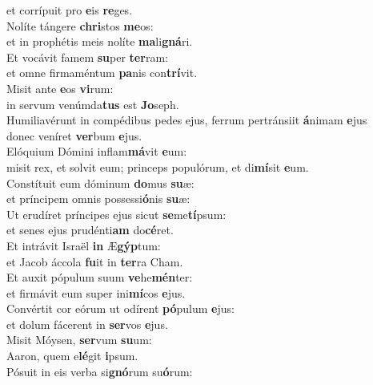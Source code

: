 \evenverse et corrípuit pro \textbf{e}is \textbf{re}ges.\\
\oddverse Nolíte tángere \textbf{chri}stos \textbf{me}os:~\*\\
\oddverse et in prophétis meis nolíte \textbf{ma}li\textbf{gná}ri.\\
\evenverse Et vocávit famem \textbf{su}per \textbf{ter}ram:~\*\\
\evenverse et omne firmaméntum \textbf{pa}nis con\textbf{trí}vit.\\
\oddverse Misit ante \textbf{e}os \textbf{vi}rum:~\*\\
\oddverse in servum venúmda\textbf{tus} est \textbf{Jo}seph.\\
\evenverse Humiliavérunt in compédibus pedes ejus, ferrum pertránsiit \textbf{á}nimam \textbf{e}jus~\*\\
\evenverse donec veníret \textbf{ver}bum \textbf{e}jus.\\
\oddverse Elóquium Dómini inflam\textbf{má}vit \textbf{e}um:~\*\\
\oddverse misit rex, et solvit eum; princeps populórum, et di\textbf{mí}sit \textbf{e}um.\\
\evenverse Constítuit eum dóminum \textbf{do}mus \textbf{su}æ:~\*\\
\evenverse et príncipem omnis possessi\textbf{ó}nis \textbf{su}æ:\\
\oddverse Ut erudíret príncipes ejus sicut \textbf{se}me\textbf{tí}psum:~\*\\
\oddverse et senes ejus prudénti\textbf{am} do\textbf{cé}ret.\\
\evenverse Et intrávit Israël \textbf{in} Æ\textbf{gýp}tum:~\*\\
\evenverse et Jacob áccola \textbf{fu}it in \textbf{ter}ra Cham.\\
\oddverse Et auxit pópulum suum \textbf{ve}he\textbf{mén}ter:~\*\\
\oddverse et firmávit eum super ini\textbf{mí}cos \textbf{e}jus.\\
\evenverse Convértit cor eórum ut odírent \textbf{pó}pulum \textbf{e}jus:~\*\\
\evenverse et dolum fácerent in \textbf{ser}vos \textbf{e}jus.\\
\oddverse Misit Móysen, \textbf{ser}vum \textbf{su}um:~\*\\
\oddverse Aaron, quem e\textbf{lé}git \textbf{i}psum.\\
\evenverse Pósuit in eis verba si\textbf{gnó}rum su\textbf{ó}rum:~\*\\
